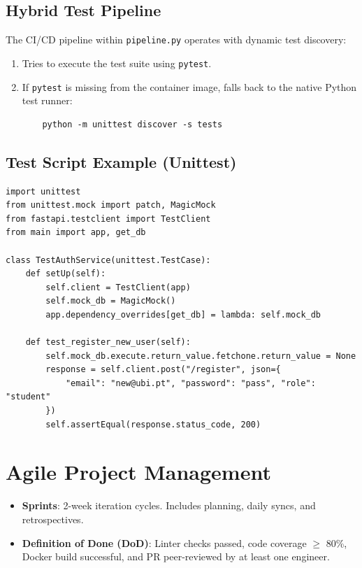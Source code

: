 \subsection{Hybrid Test Pipeline}
The \ac{CI}/\ac{CD} pipeline within \texttt{pipeline.py} operates with dynamic test discovery:
\begin{enumerate}
    \item Tries to execute the test suite using \texttt{pytest}.
    \item If \texttt{pytest} is missing from the container image, falls back to the native Python test runner:
    \begin{verbatim}
    python -m unittest discover -s tests
    \end{verbatim}
\end{enumerate}

\subsection{Test Script Example (Unittest)}
\begin{verbatim}
import unittest
from unittest.mock import patch, MagicMock
from fastapi.testclient import TestClient
from main import app, get_db

class TestAuthService(unittest.TestCase):
    def setUp(self):
        self.client = TestClient(app)
        self.mock_db = MagicMock()
        app.dependency_overrides[get_db] = lambda: self.mock_db

    def test_register_new_user(self):
        self.mock_db.execute.return_value.fetchone.return_value = None
        response = self.client.post("/register", json={
            "email": "new@ubi.pt", "password": "pass", "role": "student"
        })
        self.assertEqual(response.status_code, 200)
\end{verbatim}

\newpage

\section{Agile Project Management}
\begin{itemize}
    \item \textbf{Sprints}: 2-week iteration cycles. Includes planning, daily syncs, and retrospectives.
    \item \textbf{Definition of Done (\ac{DoD})}: Linter checks passed, code coverage $\ge$ 80\%, Docker build successful, and \ac{PR} peer-reviewed by at least one engineer.
\end{itemize}

